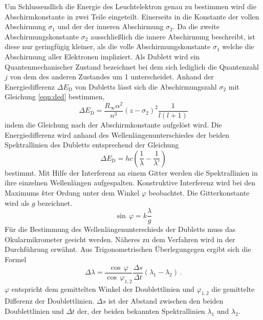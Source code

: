 Um Schlussendlich die Energie des Leuchtelektron genau zu bestimmen wird die Abschirmkonstante in zwei Teile eingeteilt. Einerseits in die Konstante der vollen Abschirmung $\sigma_1$ und der der inneren Abschirmung $\sigma_2$. Da die zweite Abschirmungskonstante $\sigma_2$ ausschließlich die innere Abschirmung beschreibt, ist diese nur geringfügig kleiner, als die volle Abschirmungskonstante $\sigma_1$ welche die Abschirmung aller Elektronen  impliziert. Als Dublett wird ein Quantenmechanischer Zustand bezeichnet bei dem sich lediglich die Quantenzahl $j$ von dem des anderen Zustandes um 1 unterscheidet. Anhand der Energiedifferenz $\Delta E_\text{D}$ von Dubletts lässt sich die Abschirmungszahl $\sigma_2$ mit Gleichung \eqref{eqn:ded} bestimmen,
\begin{equation}
  \Delta E_\text{D} = \frac{R_{\infty} \alpha^2}{n^3} \left( z - \sigma_2 \right)^2 \frac{1}{l(l+1)}
  \label{eqn:ded}
\end{equation}
indem die Gleichung nach der Abschirmkonstante aufgelöst wird. Die Energiedifferenz wird anhand des Wellenlängenunterschiedes der beiden Spektrallinien des Dubletts entsprechend der Gleichung
\begin{equation}
  \Delta E_\text{D} = hc\left( \frac{1}{\lambda} - \frac{1}{\lambda'} \right)
  \label{eqn:ed}
\end{equation}
bestimmt.
Mit Hilfe der Interferenz an einem Gitter werden die Spektrallinien in ihre einzelnen Wellenlängen aufgespalten. Konstruktive Interferenz wird bei den Maximums $k$ter Ordung unter dem Winkel $\varphi$ beobachtet. Die Gitterkonstante wird als $g$ bezeichnet.
\begin{equation}
  \sin \, \varphi = k \frac{\lambda}{g}
  \label{eqn:phi}
\end{equation}
Für die Bestimmung des Wellenlängenunterschieds der Dubletts muss das Okularmikrometer geeicht werden. Näheres zu dem Verfahren wird in der Durchführung erwähnt. Aus Trigonometrischen Überlegungegen ergibt sich die Formel
\begin{equation}
  \Delta\lambda = \frac{\cos \, \varphi}{\cos \, \varphi_{1,2}} \frac{\Delta s}{\Delta t}\left( \lambda_1 - \lambda_2 \right) \ .
  \label{eqn:dlam}
\end{equation}
$\varphi$ entspricht dem gemittelten Winkel der Doublettlinien und $\varphi_{1,2}$ die gemittelte Differenz der Doublettlinien. $\Delta s$ ist der Abstand zwischen den beiden Doublettlinien und $\Delta t$ der, der beiden bekannten Spektrallinien $\lambda_1$ und $\lambda_2$.

